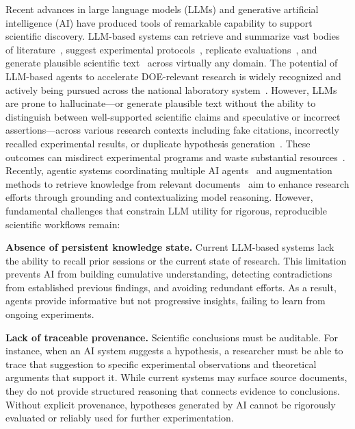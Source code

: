 \documentclass{files/proposalnsf}
\begin{document}
Recent advances in large language models (LLMs) and generative artificial intelligence (AI) have produced tools of remarkable capability to support scientific discovery. LLM-based systems can retrieve and summarize vast bodies of literature~\cite{azher2024limtopic}, suggest experimental protocols~\cite{zhang2025exploring}, replicate evaluations~\cite{liang2024can}, and generate plausible scientific text~\cite{huang2023role} across virtually any domain.  The potential of LLM-based agents to accelerate DOE-relevant research is widely recognized and actively being pursued across the national laboratory system~\cite{rummler2026sandians}. However, LLMs are prone to hallucinate---or generate plausible text without the ability to distinguish between well-supported scientific claims and speculative or incorrect assertions---across various research contexts including fake citations, incorrectly recalled experimental results, or duplicate hypothesis generation~\cite{lee2025chatgpt}. These outcomes can misdirect experimental programs and waste substantial resources~\cite{resnik2026hallucinated}. Recently, agentic systems coordinating multiple AI agents~\cite{bazgir2025agentichypothesis,ghafarollahi2025sciagents} and augmentation methods to retrieve knowledge from relevant documents~\cite{pelletier2024explainable,zhang2024causal} aim to enhance research efforts through grounding and contextualizing model reasoning. However, fundamental challenges that constrain LLM utility for rigorous, reproducible scientific workflows remain:

\textbf{Absence of persistent knowledge state.} Current LLM-based systems lack the ability to recall prior sessions or the current state of research. This limitation prevents AI from building cumulative understanding, detecting contradictions from established previous findings, and avoiding redundant efforts. As a result, agents provide informative but not progressive insights, failing to learn from ongoing experiments.

\textbf{Lack of traceable provenance.} Scientific conclusions must be auditable. For instance, when an AI system suggests a hypothesis, a researcher must be able to trace that suggestion to specific experimental observations and theoretical arguments that support it. While current systems may surface source documents, they do not provide structured reasoning that connects evidence to conclusions. Without explicit provenance, hypotheses generated by AI cannot be rigorously evaluated or reliably used for further experimentation. \vspace{-5pt}
\end{document}
